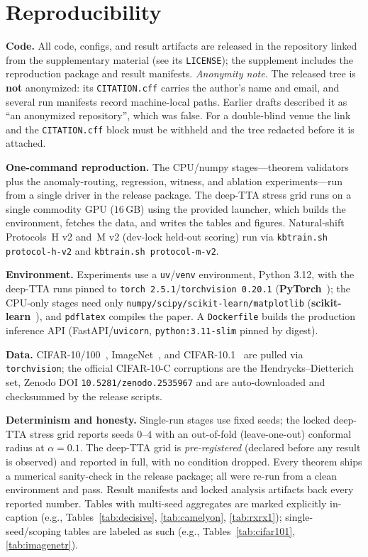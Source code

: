 \documentclass[conference]{IEEEtran}
\theoremstyle{plain}
\theoremstyle{definition}
\begin{document}
\section{Reproducibility}\label{sec:repro}
\textbf{Code.} All code, configs, and result artifacts are released in the repository linked from
the supplementary material (see its \texttt{LICENSE}); the supplement includes the reproduction
package and result manifests. \emph{Anonymity note.} The released tree is \textbf{not} anonymized:
its \texttt{CITATION.cff} carries the author's name and email, and several run manifests record
machine-local paths. Earlier drafts described it as ``an anonymized repository'', which was false.
For a double-blind venue the link and the \texttt{CITATION.cff} block must be withheld and the tree
redacted before it is attached.

\noindent\textbf{One-command reproduction.} The CPU/numpy stages---theorem validators plus the
anomaly-routing, regression, witness, and ablation experiments---run from a single driver in the
release package. The deep-TTA stress grid runs on a single commodity GPU ($16$\,GB) using the
provided launcher, which builds the environment, fetches the data, and writes the tables and figures.
Natural-shift Protocols~H v2 and~M v2 (dev-lock held-out scoring) run via
\texttt{kbtrain.sh protocol-h-v2} and \texttt{kbtrain.sh protocol-m-v2}.

\noindent\textbf{Environment.} Experiments use a \texttt{uv}/\texttt{venv} environment, Python
3.12, with the deep-TTA runs pinned to \texttt{torch 2.5.1}/\texttt{torchvision 0.20.1}
(\textbf{PyTorch}~\cite{paszke2019pytorch}); the CPU-only stages need only
\texttt{numpy/scipy/scikit-learn/matplotlib} (\textbf{scikit-learn}~\cite{pedregosa2011sklearn}),
and \texttt{pdflatex}
compiles the paper. A \texttt{Dockerfile} builds the production inference API
(FastAPI/\texttt{uvicorn}, \texttt{python:3.11-slim} pinned by digest).

\noindent\textbf{Data.} CIFAR-10/100~\cite{krizhevsky2009learningmultiple},
ImageNet~\cite{deng2009imagenet}, and CIFAR-10.1~\cite{recht2019cifar10}
are pulled via \texttt{torchvision}; the official CIFAR-10-C
corruptions are the Hendrycks--Dietterich set, Zenodo DOI \texttt{10.5281/zenodo.2535967}
and are auto-downloaded and checksummed by the release scripts.

\noindent\textbf{Determinism and honesty.} Single-run stages use fixed seeds; the locked
deep-TTA stress grid reports seeds $0$--$4$ with an out-of-fold (leave-one-out) conformal radius at
$\alpha=0.1$. The deep-TTA grid is \emph{pre-registered} (declared before any result is
observed) and reported in full, with no condition dropped. Every theorem ships a numerical
sanity-check in the release package; all were re-run
from a clean environment and pass. Result manifests and locked analysis artifacts back every
reported number. Tables with multi-seed aggregates are marked explicitly in-caption
(e.g., Tables~\ref{tab:decisive}, \ref{tab:camelyon}, \ref{tab:rxrx1}); single-seed/scoping tables
are labeled as such (e.g., Tables~\ref{tab:cifar101}, \ref{tab:imagenetr}).
\end{document}
